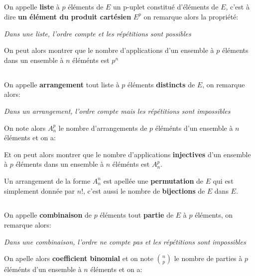\subsection*{}
On appelle \textbf{liste} à \(p\) éléments de \(E\) un p-uplet constitué d'éléments de \(E\), c'est à dire \textbf{un élément du produit cartésien} \(E^p\) on remarque alors la propriété:
\begin{center}
   \textit{
      Dans une liste, l'ordre compte et les répétitions sont possibles
   }
\end{center}

On peut alors montrer que le nombre d'applications d'un ensemble à \(p\) éléments dans un ensemble à \(n\) éléménts est \(p^n\)

\subsection*{}
On appelle \textbf{arrangement} tout liste à \(p\) éléments \textbf{distincts} de \(E\), on remarque alors:
\begin{center}
   \textit{
      Dans un arrangement, l'ordre compte mais les répétitions sont impossibles
   }
\end{center}
On note alors \(A_n^p\) le nombre d'arrangements de \(p\) éléménts d'un ensemble à \(n\) éléments et on a:

Et on peut alors montrer que le nombre d'applications \textbf{injectives} d'un ensemble à \(p\) éléments dans un ensemble à \(n\) éléménts est \(A_n^p\).\<

Un arrangement de la forme \(A_n^n\) est apellée une \textbf{permutation} de \(E\) qui est simplement donnée par \(n!\), c'est aussi le nombre de \textbf{bijections} de \(E\) dans \(E\).

\subsection*{}
On appelle \textbf{combinaison} de \(p\) éléments tout \textbf{partie} de \(E\) à \(p\) éléments, on remarque alors:
\begin{center}
   \textit{
      Dans une combinaison, l'ordre ne compte pas et les répétitions sont impossibles
   }
\end{center}
On apelle alors \textbf{coefficient binomial} et on note \(\binom{n}{p}\) le nombre de parties à \(p\) éléménts d'un ensemble à \(n\) éléments et on a:

